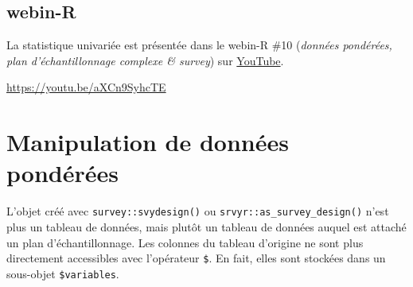 \documentclass[
  letterpaper,
  DIV=11,
  numbers=noendperiod,
  oneside]{scrreprt}
\newenvironment{Shaded}{\begin{snugshade}}{\end{snugshade}}
\newcommand{\AttributeTok}[1]{\textcolor[rgb]{0.40,0.45,0.13}{#1}}
\newcommand{\DecValTok}[1]{\textcolor[rgb]{0.68,0.00,0.00}{#1}}
\newcommand{\FunctionTok}[1]{\textcolor[rgb]{0.28,0.35,0.67}{#1}}
\newcommand{\NormalTok}[1]{\textcolor[rgb]{0.00,0.23,0.31}{#1}}
\newcommand{\OtherTok}[1]{\textcolor[rgb]{0.00,0.23,0.31}{#1}}
\newcommand{\SpecialCharTok}[1]{\textcolor[rgb]{0.37,0.37,0.37}{#1}}
\begin{document}
\begin{Shaded}
\end{Shaded}

\hypertarget{webin-r-10}{%
\section{webin-R}\label{webin-r-10}}

La statistique univariée est présentée dans le webin-R \#10
(\emph{données pondérées, plan d'échantillonnage complexe \& survey})
sur \href{https://youtu.be/aXCn9SyhcTE}{YouTube}.

\url{https://youtu.be/aXCn9SyhcTE}

\hypertarget{sec-manipulation-donnees-ponderees}{%
\chapter{Manipulation de données
pondérées}\label{sec-manipulation-donnees-ponderees}}

L'objet créé avec \texttt{survey::svydesign()} ou
\texttt{srvyr::as\_survey\_design()} n'est plus un tableau de données,
mais plutôt un tableau de données auquel est attaché un plan
d'échantillonnage. Les colonnes du tableau d'origine ne sont plus
directement accessibles avec l'opérateur \texttt{\$}. En fait, elles
sont stockées dans un sous-objet \texttt{\$variables}.

\begin{Shaded}
\end{Shaded}
\end{document}

